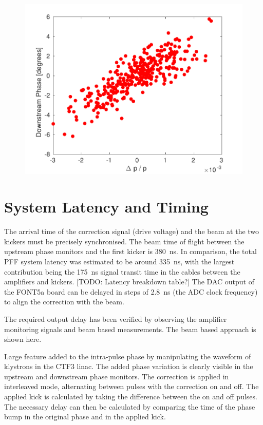\documentclass[%
 reprint,
 superscriptaddress,
 amsmath,
 amssymb,
 prstab,
]{revtex4-1}
\begin{document}
\begin{figure}
	\includegraphics[width=\columnwidth]{figs/prop/corrDownstreamEn}%
	\caption{\label{f:corrDownstreamEn}
	}
\end{figure}

\section{\label{s:timing}System Latency and Timing}

The arrival time of the correction signal (drive voltage) and the beam at the 
two kickers must be precisely synchronised. The beam time of flight between the 
upstream phase monitors and the first kicker is 380~ns. In comparison, the 
total PFF system latency was estimated to be around 335~ns, with the largest 
contribution being the 175~ns signal transit time in the cables between the 
amplifiers and kickers. [TODO: Latency breakdown table?] The DAC output of the 
FONT5a board can be delayed in steps of 2.8~ns (the ADC clock frequency) to 
align the correction with the beam.

The required output delay has been verified by observing the amplifier 
monitoring signals and beam based measurements. The beam based approach is 
shown here. 

Large feature added to the intra-pulse phase by manipulating the waveform of 
klystrons in the CTF3 linac. The added phase variation is clearly visible in 
the upstream and downstream phase monitors. The correction is applied in 
interleaved mode, alternating between pulses with the correction on and off. 
The applied kick is calculated by taking the difference between the on and off 
pulses. The necessary delay can then be calculated by comparing the time of the 
phase bump in the original phase and in the applied kick.
\end{document}

